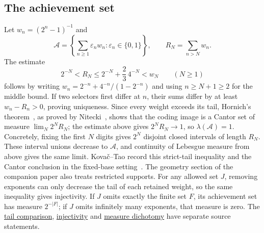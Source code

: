 \documentclass[11pt]{article}
\newcommand{\Ach}{\mathcal A}
\begin{document}
\subsection{The achievement set}\label{sec:geometry}
Let $w_n=(2^n-1)^{-1}$ and
\[
 \Ach=\left\{\sum_{n\ge1}\varepsilon_nw_n:
                   \varepsilon_n\in\{0,1\}\right\},\qquad
 R_N=\sum_{n>N}w_n.
\]
The estimate
\[
 2^{-N}<R_N\le2^{-N}+\frac23\,4^{-N}<w_N\qquad(N\ge1)
\]
follows by writing $w_n=2^{-n}+4^{-n}/(1-2^{-n})$ and using
$n\ge N+1\ge2$ for the middle bound. If two selectors first differ
at $n$, their sums differ by at least $w_n-R_n>0$, proving uniqueness.
Since every weight exceeds its tail, Hornich's theorem~\cite{hornich1941}, as proved by
Nitecki~\cite[Theorem~4(1), p.~9]{nitecki2013}, shows that the coding image is
a Cantor set of measure $\lim_N2^NR_N$; the estimate above gives
$2^NR_N\to1$, so $\lambda(\Ach)=1$.
Concretely, fixing the first $N$ digits gives $2^N$ disjoint closed
intervals of length $R_N$.  These interval unions decrease to $\Ach$,
and continuity of Lebesgue measure from above gives the same limit.
Kova\v{c}--Tao record this strict-tail inequality and the Cantor conclusion in the fixed-base setting~\cite[Remark~4.1]{kovactao}.
The
{geometry section of the companion paper} also treats restricted supports.
For any allowed set $J$, removing exponents can only decrease the tail
of each retained weight, so the same inequality gives injectivity. If $J$ omits exactly the
finite set $F$, its achievement set has measure $2^{-|F|}$; if $J$
omits infinitely many exponents, that measure is zero. The
\href{https://github.com/wcook04/plectis-erdos/blob/c91562bd574a387cde904481e609c7b4cacebb14/lean/ErdosProblems/Erdos257/MersenneSubseriesRigidity.lean\#L30}{tail comparison},
\href{https://github.com/wcook04/plectis-erdos/blob/c91562bd574a387cde904481e609c7b4cacebb14/lean/ErdosProblems/Erdos257/MersenneSubseriesRigidity.lean\#L54}{injectivity} and
\href{https://github.com/wcook04/plectis-erdos/blob/c91562bd574a387cde904481e609c7b4cacebb14/lean/ErdosProblems/Erdos257/MersenneSubseriesRigidity.lean\#L397}{measure dichotomy} have separate source statements.
\end{document}
